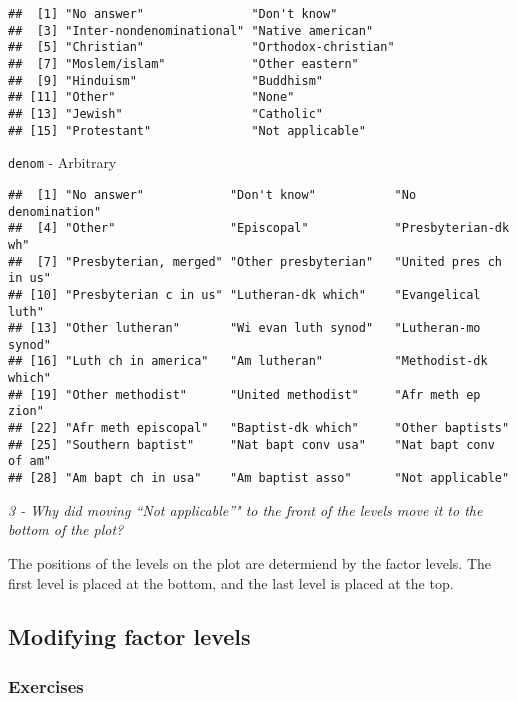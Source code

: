 \documentclass[]{article}
\newenvironment{Shaded}{\begin{snugshade}}{\end{snugshade}}
\newcommand{\KeywordTok}[1]{\textcolor[rgb]{0.13,0.29,0.53}{\textbf{#1}}}
\newcommand{\OperatorTok}[1]{\textcolor[rgb]{0.81,0.36,0.00}{\textbf{#1}}}
\newcommand{\NormalTok}[1]{#1}
\theoremstyle{definition}
\theoremstyle{definition}
\theoremstyle{definition}
\theoremstyle{remark}
\begin{document}
\begin{verbatim}
##  [1] "No answer"               "Don't know"             
##  [3] "Inter-nondenominational" "Native american"        
##  [5] "Christian"               "Orthodox-christian"     
##  [7] "Moslem/islam"            "Other eastern"          
##  [9] "Hinduism"                "Buddhism"               
## [11] "Other"                   "None"                   
## [13] "Jewish"                  "Catholic"               
## [15] "Protestant"              "Not applicable"
\end{verbatim}

\texttt{denom} - Arbitrary

\begin{Shaded}
\end{Shaded}

\begin{verbatim}
##  [1] "No answer"            "Don't know"           "No denomination"     
##  [4] "Other"                "Episcopal"            "Presbyterian-dk wh"  
##  [7] "Presbyterian, merged" "Other presbyterian"   "United pres ch in us"
## [10] "Presbyterian c in us" "Lutheran-dk which"    "Evangelical luth"    
## [13] "Other lutheran"       "Wi evan luth synod"   "Lutheran-mo synod"   
## [16] "Luth ch in america"   "Am lutheran"          "Methodist-dk which"  
## [19] "Other methodist"      "United methodist"     "Afr meth ep zion"    
## [22] "Afr meth episcopal"   "Baptist-dk which"     "Other baptists"      
## [25] "Southern baptist"     "Nat bapt conv usa"    "Nat bapt conv of am" 
## [28] "Am bapt ch in usa"    "Am baptist asso"      "Not applicable"
\end{verbatim}

\emph{3 - Why did moving ``Not applicable''" to the front of the levels
move it to the bottom of the plot?}

The positions of the levels on the plot are determiend by the factor
levels. The first level is placed at the bottom, and the last level is
placed at the top.

\subsection{Modifying factor levels}\label{modifying-factor-levels}

\subsubsection{Exercises}\label{exercises-39}
\end{document}
